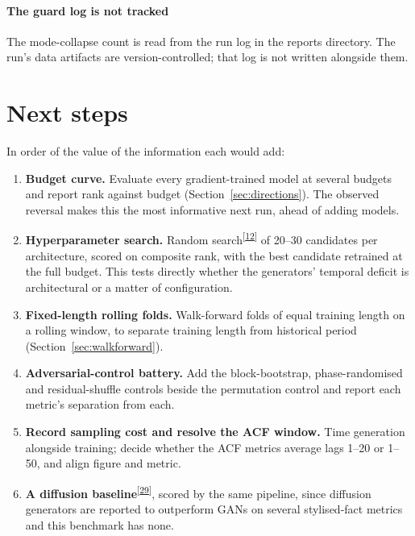 \documentclass[11pt,a4paper]{article}
\makeatletter
\newcommand{\tcite}[1]{\textsuperscript{[\hyperlink{R:#1}{#1}]}}
\DeclareRobustCommand{\_}{\ifmmode\nfss@text{\textunderscore}\else\textunderscore\allowbreak\fi}
\makeatother
\begin{document}
\paragraph{The guard log is not tracked} The mode-collapse count is read from the run log in the reports directory. The run's data artifacts are version-controlled; that log is not written alongside them.

\section{Next steps}
\label{sec:next}
In order of the value of the information each would add:
\begin{enumerate}
\item \textbf{Budget curve.} Evaluate every gradient-trained model at several budgets and report rank against budget (Section~\ref{sec:directions}). The observed reversal makes this the most informative next run, ahead of adding models.
\item \textbf{Hyperparameter search.} Random search\tcite{12} of 20--30 candidates per architecture, scored on composite rank, with the best candidate retrained at the full budget. This tests directly whether the generators' temporal deficit is architectural or a matter of configuration.
\item \textbf{Fixed-length rolling folds.} Walk-forward folds of equal training length on a rolling window, to separate training length from historical period (Section~\ref{sec:walkforward}).
\item \textbf{Adversarial-control battery.} Add the block-bootstrap, phase-randomised and residual-shuffle controls beside the permutation control and report each metric's separation from each.
\item \textbf{Record sampling cost and resolve the ACF window.} Time generation alongside training; decide whether the ACF metrics average lags 1--20 or 1--50, and align figure and metric.
\item \textbf{A diffusion baseline}\tcite{29}, scored by the same pipeline, since diffusion generators are reported to outperform GANs on several stylised-fact metrics and this benchmark has none.
\end{enumerate}
\clearpage
\end{document}
